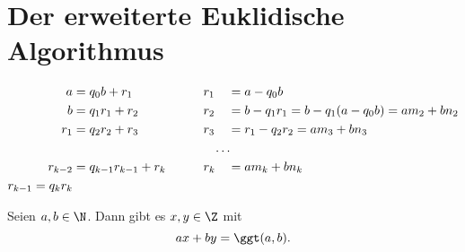 \section*{Der erweiterte Euklidische Algorithmus}

\begin{alignat*}{3}
	a &= q_0 b +r_1 &&\qquad r_1 &&= a - q_0 b\\
	b &= q_1 r_1 + r_2 &&\qquad r_2 &&= b - q_1 r_1 = b - q_1(a-q_0b) = am_2 + bn_2\\
	r_1 &= q_2 r_2 + r_3 &&\qquad r_3 &&= r_1 - q_2 r_2 = a m_3 + bn_3\\
	\noalign{\centering \dots}
	r_{k-2} &= q_{k-1}r_{k-1} + r_k &&\qquad r_k &&= am_k + bn_k\\
	r_{k-1} = q_k r_k 
\end{alignat*}

\begin{thm}\autolabel
	Seien $a,b \in \N$. Dann gibt es \( x,y \in \Z \) mit
	\[ ax + by = \ggt(a,b). \]
\end{thm}